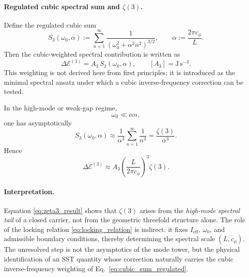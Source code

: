 \documentclass[11pt]{article}
\begin{document}
    \paragraph{Regulated cubic spectral sum and \texorpdfstring{$\zeta(3)$}{zeta(3)}.}
        Define the regulated cubic sum
        \begin{equation}
            S_3(\omega_0,\alpha)
            :=
            \sum_{n=1}^{\infty}
            \frac{1}{\left(\omega_0^2+\alpha^2 n^2\right)^{3/2}},
            \qquad
            \alpha := \frac{2\pi c_\phi}{L}.
            \label{eq:S3_regulated}
        \end{equation}
        Then the cubic-weighted spectral contribution is written as
        \begin{equation}
            \Delta \mathcal{E}^{(3)}
            =
            A_3\,S_3(\omega_0,\alpha),
            \qquad
            [A_3]=\mathrm{J\,s^{-3}}.
            \label{eq:cubic_sum_regulated}
        \end{equation}
        This weighting is not derived here from first principles; it is introduced as the minimal spectral ansatz under which a cubic inverse-frequency correction can be tested.

        In the high-mode or weak-gap regime,
        \begin{equation}
            \omega_0 \ll \alpha n,
        \end{equation}
        one has asymptotically
        \begin{equation}
            S_3(\omega_0,\alpha)
            \approx
            \frac{1}{\alpha^3}\sum_{n=1}^{\infty}\frac{1}{n^3}
            =
            \frac{\zeta(3)}{\alpha^3}.
            \label{eq:S3_asymptotic_main}
        \end{equation}
        Hence
        \begin{equation}
            \boxed{
                \Delta \mathcal{E}^{(3)}
                \approx
                A_3
                \left(\frac{L}{2\pi c_\phi}\right)^3
                \zeta(3).
            }
            \label{eq:zeta3_result}
        \end{equation}

    \paragraph{Interpretation.}
        Equation \eqref{eq:zeta3_result} shows that $\zeta(3)$ arises from the \emph{high-mode spectral tail} of a closed carrier, not from the geometric threefold structure alone. The role of the locking relation \eqref{eq:locking_relation} is indirect: it fixes $I_{\mathrm{eff}}$, $\omega_0$, and admissible boundary conditions, thereby determining the spectral scale $(L,c_\phi)$. The unresolved step is not the asymptotics of the mode tower, but the physical identification of an SST quantity whose correction naturally carries the cubic inverse-frequency weighting of Eq.~\eqref{eq:cubic_sum_regulated}.
\end{document}
